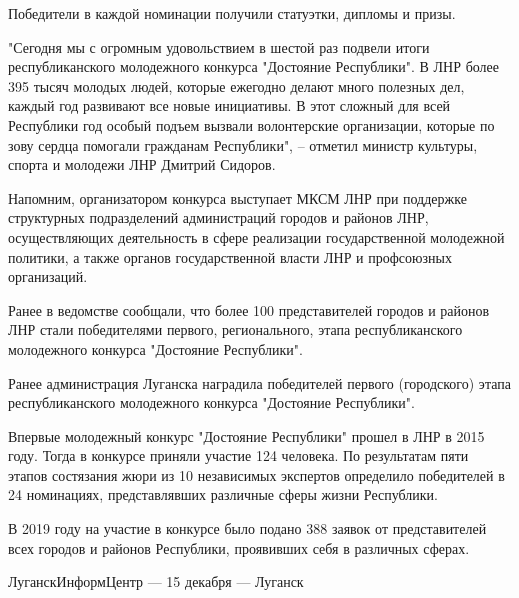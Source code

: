 Победители в каждой номинации получили статуэтки, дипломы и призы.

"Сегодня мы с огромным удовольствием в шестой раз подвели итоги
республиканского молодежного конкурса "Достояние Республики". В ЛНР более 395
тысяч молодых людей, которые ежегодно делают много полезных дел, каждый год
развивают все новые инициативы. В этот сложный для всей Республики год особый
подъем вызвали волонтерские организации, которые по зову сердца помогали
гражданам Республики", – отметил министр культуры, спорта и молодежи ЛНР
Дмитрий Сидоров.

Напомним, организатором конкурса выступает МКСМ ЛНР при поддержке структурных
подразделений администраций городов и районов ЛНР, осуществляющих деятельность
в сфере реализации государственной молодежной политики, а также органов
государственной власти ЛНР и профсоюзных организаций.

Ранее в ведомстве сообщали, что более 100 представителей городов и районов ЛНР
стали победителями первого, регионального, этапа республиканского молодежного
конкурса "Достояние Республики".

Ранее администрация Луганска наградила победителей первого (городского) этапа
республиканского молодежного конкурса "Достояние Республики".

Впервые молодежный конкурс "Достояние Республики" прошел в ЛНР в 2015 году.
Тогда в конкурсе приняли участие 124 человека. По результатам пяти этапов
состязания жюри из 10 независимых экспертов определило победителей в 24
номинациях, представлявших различные сферы жизни Республики.

В 2019 году на участие в конкурсе было подано 388 заявок от представителей всех
городов и районов Республики, проявивших себя в различных сферах.

ЛуганскИнформЦентр — 15 декабря — Луганск

